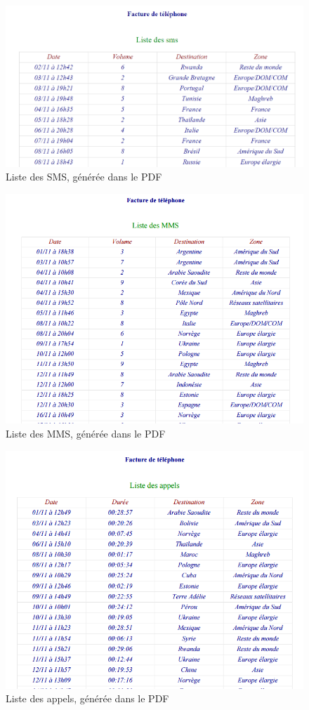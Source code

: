 \begin{figure}[ht]
  \centering
  \includegraphics[width=.55\textwidth]{images/Plateforme/liste_sms_pdf}
  \caption{Liste des SMS, générée dans le PDF}
  \label{fig:liste_sms_pdf}
\end{figure}

\begin{figure}[ht]
  \centering
  \includegraphics[width=.55\textwidth]{images/Plateforme/liste_mms_pdf}
  \caption{Liste des MMS, générée dans le PDF}
  \label{fig:liste_mms_pdf}
\end{figure}

\begin{figure}[ht]
  \centering
  \includegraphics[width=.55\textwidth]{images/Plateforme/liste_appels_pdf}
  \caption{Liste des appels, générée dans le PDF}
  \label{fig:liste_appels_pdf}
\end{figure}


